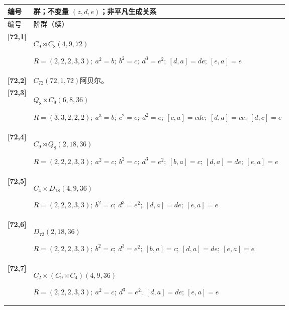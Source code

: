 \documentclass[UTF8,fontset=fandol,11pt,a4paper]{ctexart}
\begin{document}
\begingroup\small\setlength{\tabcolsep}{3pt}\renewcommand{\arraystretch}{1.12}

\begin{longtable}{@{}p{17mm}>{\raggedright\arraybackslash}p{141mm}@{}}

\toprule 编号 & 群；不变量 $(z,d,e)$；非平凡生成关系\\\midrule\endfirsthead

\toprule 编号 & 72 阶群（续）\\\midrule\endhead\bottomrule\endfoot

\textbf{[72,1]} & $C_{9}\rtimes C_{8}$\quad $(4,9,72)$\par\(R=(2,2,2,3,3);\allowbreak\ a^{2}=b;\allowbreak\ b^{2}=c;\allowbreak\ d^{3}=e^{2};\allowbreak\ [d,a]=de;\allowbreak\ [e,a]=e\)\\[3pt]

\textbf{[72,2]} & $C_{72}$\quad $(72,1,72)$\quad 阿贝尔。\\[3pt]

\textbf{[72,3]} & $Q_{8}\rtimes C_{9}$\quad $(6,8,36)$\par\(R=(3,3,2,2,2);\allowbreak\ a^{3}=b;\allowbreak\ c^{2}=e;\allowbreak\ d^{2}=e;\allowbreak\ [c,a]=cde;\allowbreak\ [d,a]=ce;\allowbreak\ [d,c]=e\)\\[3pt]

\textbf{[72,4]} & $C_{9}\rtimes Q_{8}$\quad $(2,18,36)$\par\(R=(2,2,2,3,3);\allowbreak\ a^{2}=c;\allowbreak\ b^{2}=c;\allowbreak\ d^{3}=e^{2};\allowbreak\ [b,a]=c;\allowbreak\ [d,a]=de;\allowbreak\ [e,a]=e\)\\[3pt]

\textbf{[72,5]} & $C_{4}\times D_{18}$\quad $(4,9,36)$\par\(R=(2,2,2,3,3);\allowbreak\ b^{2}=c;\allowbreak\ d^{3}=e^{2};\allowbreak\ [d,a]=de;\allowbreak\ [e,a]=e\)\\[3pt]

\textbf{[72,6]} & $D_{72}$\quad $(2,18,36)$\par\(R=(2,2,2,3,3);\allowbreak\ b^{2}=c;\allowbreak\ d^{3}=e^{2};\allowbreak\ [b,a]=c;\allowbreak\ [d,a]=de;\allowbreak\ [e,a]=e\)\\[3pt]

\textbf{[72,7]} & $C_{2}\times (C_{9}\rtimes C_{4})$\quad $(4,9,36)$\par\(R=(2,2,2,3,3);\allowbreak\ a^{2}=c;\allowbreak\ d^{3}=e^{2};\allowbreak\ [d,a]=de;\allowbreak\ [e,a]=e\)\\[3pt]


\end{longtable}
\end{document}

